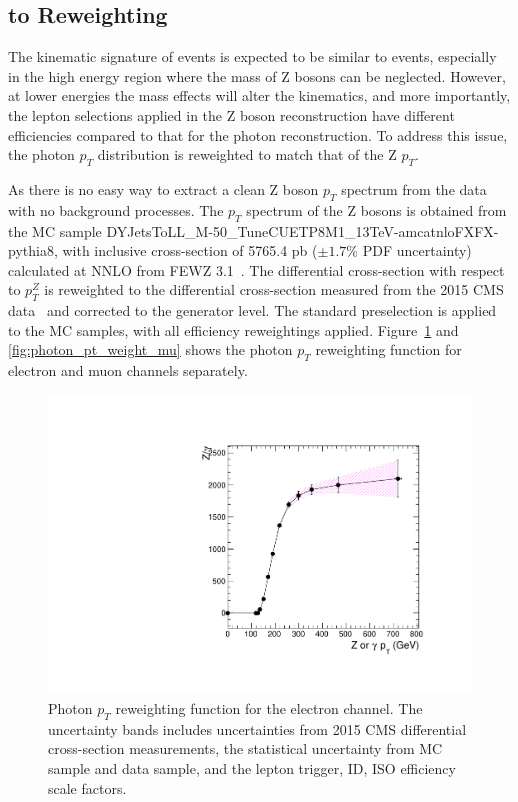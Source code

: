 \subsection{ to  Reweighting}\label{sec:bg_gjetpt}
The kinematic signature of \gjets events is expected to be similar to \Zjets events, especially in the high energy region where the mass of Z bosons can be neglected. However, at lower energies the mass effects will alter the kinematics, and more importantly, the lepton selections applied in the Z boson reconstruction have different efficiencies compared to that for the photon reconstruction. To address this issue, the photon $p_T$ distribution is reweighted to match that of the Z $p_T$. 

\vspace{0.3cm}
As there is no easy way to extract a clean Z boson $p_T$ spectrum from the data with no background processes. The $p_T$ spectrum of the Z bosons is obtained from the MC sample DYJetsToLL\_M-50\_TuneCUETP8M1\_13TeV-amcatnloFXFX-pythia8, with inclusive cross-section of 5765.4 pb ($\pm 1.7\%$ PDF uncertainty) calculated at NNLO from FEWZ 3.1~\cite{bg_fewz}. The differential cross-section with respect to $p_T^Z$ is reweighted to the \Zjets differential cross-section measured from the 2015 CMS data~\cite{bg_2015zjetxsec} and corrected to the generator level. The standard preselection is applied to the MC samples, with all efficiency reweightings applied. Figure~\ref{fig:photon_pt_weight_el} and \ref{fig:photon_pt_weight_mu} shows the photon $p_T$ reweighting function for electron and muon channels separately. 

\begin{figure}[htbp]
\centering
  \includegraphics[width=0.9\linewidth]{figures/study_gjets_data_allcorV2_modify_el.pdf}
  \caption{Photon $p_T$ reweighting function for the electron channel.
 The uncertainty bands includes uncertainties from 2015 CMS \Zjets differential cross-section measurements, the statistical uncertainty from \Zjets MC sample and \gjets data sample, and the lepton trigger, ID, ISO efficiency scale factors.}
  \label{fig:photon_pt_weight_el}
\end{figure}

